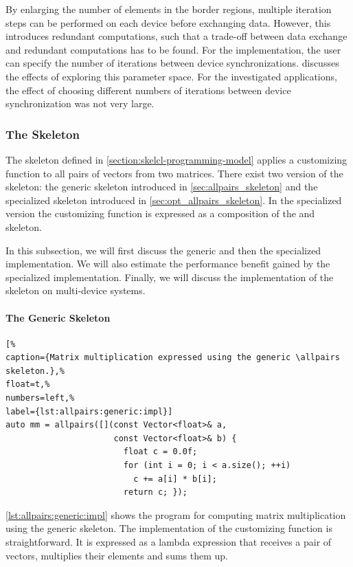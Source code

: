 By enlarging the number of elements in the border regions, multiple iteration steps can be performed on each device before exchanging data.
However, this introduces redundant computations, such that a trade-off between data exchange and redundant computations has to be found.
For the  implementation, the user can specify the number of iterations between device synchronizations.
\cite{Breuer2014} discusses the effects of exploring this parameter space.
For the investigated applications, the effect of choosing different numbers of iterations between device synchronization was not very large.


\subsubsection{The \allpairs Skeleton}
The \allpairs skeleton defined in \autoref{section:skelcl-programming-model} applies a customizing function to all pairs of vectors from two matrices.
There exist two version of the skeleton: the generic \allpairs skeleton introduced in \autoref{sec:allpairs_skeleton} and the specialized \allpairs skeleton introduced in \autoref{sec:opt_allpairs_skeleton}.
In the specialized version the customizing function is expressed as a composition of the \zip and \reduce skeleton.

In this subsection, we will first discuss the generic and then the specialized implementation.
We will also estimate the performance benefit gained by the specialized implementation.
Finally, we will discuss the implementation of the \allpairs skeleton on multi-device systems.

\paragraph{The Generic \allpairs Skeleton}
\begin{lstlisting}[%                                                             
caption={Matrix multiplication expressed using the generic \allpairs skeleton.},%
float=t,%                                                                       
numbers=left,%
label={lst:allpairs:generic:impl}]
auto mm = allpairs([](const Vector<float>& a,
                      const Vector<float>& b) {
                        float c = 0.0f;
                        for (int i = 0; i < a.size(); ++i)
                          c += a[i] * b[i];
                        return c; });
\end{lstlisting}

\autoref{lst:allpairs:generic:impl} shows the \SkelCL program for computing matrix multiplication using the generic \allpairs skeleton.
The implementation of the customizing function is straightforward.
It is expressed as a lambda expression that receives a pair of vectors, multiplies their elements and sums them up.

